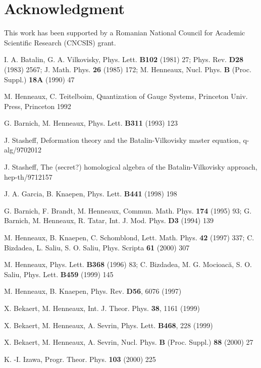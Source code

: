 \documentclass[a4paper,12pt]{article}
\begin{document}
\section*{Acknowledgment}

This work has been supported by a Romanian
National Council for Academic
Scientific Research (CNCSIS) grant.

\begin{thebibliography}{99}
  I. A. Batalin, G. A. Vilkovisky,
Phys. Lett. \textbf{B102}
(1981) 27; Phys. Rev. \textbf{D28} (1983) 2567;
J. Math. Phys. \textbf{26}
(1985) 172; M. Henneaux, Nucl. Phys. \textbf{B}
(Proc. Suppl.) \textbf{18A}
(1990) 47

  M. Henneaux, C. Teitelboim,
Quantization of Gauge Systems,
Princeton Univ. Press, Princeton 1992

  G. Barnich, M. Henneaux,
Phys. Lett. \textbf{B311} (1993) 123

  J. Stasheff, Deformation
theory and the Batalin-Vilkovisky
master equation, q-alg/9702012

  J. Stasheff, The (secret?)
homological algebra of the
Batalin-Vilkovisky approach, hep-th/9712157

  J. A. Garcia, B. Knaepen,
Phys. Lett. \textbf{B441} (1998) 198

  G. Barnich, F. Brandt, M.
Henneaux, Commun. Math. Phys. \textbf{%
174} (1995) 93; G. Barnich, M. Henneaux,
R. Tatar, Int. J. Mod. Phys.
\textbf{D3} (1994) 139

  M. Henneaux, B. Knaepen, C.
Schomblond, Lett. Math. Phys.
\textbf{42} (1997) 337; C. Bizdadea, L.
Saliu, S. O. Saliu, Phys. Scripta
\textbf{61} (2000) 307

  M. Henneaux, Phys. Lett.
\textbf{B368} (1996) 83; C. Bizdadea,
M. G. Mocioac\u {a}, S. O. Saliu, Phys.
Lett. \textbf{B459} (1999) 145

  M. Henneaux, B. Knaepen,
Phys. Rev. \textbf{D56}, 6076 (1997)

  X. Bekaert, M. Henneaux,
Int. J. Theor. Phys. \textbf{38},
1161 (1999)

  X. Bekaert, M. Henneaux,
A. Sevrin, Phys. Lett. \textbf{B468},
228 (1999)

  X. Bekaert, M. Henneaux,
A. Sevrin, Nucl. Phys. \textbf{B}
(Proc. Suppl.) \textbf{88} (2000) 27

  K. -I. Izawa, Progr. Theor.
Phys. \textbf{103} (2000) 225


\end{thebibliography}
\end{document}
